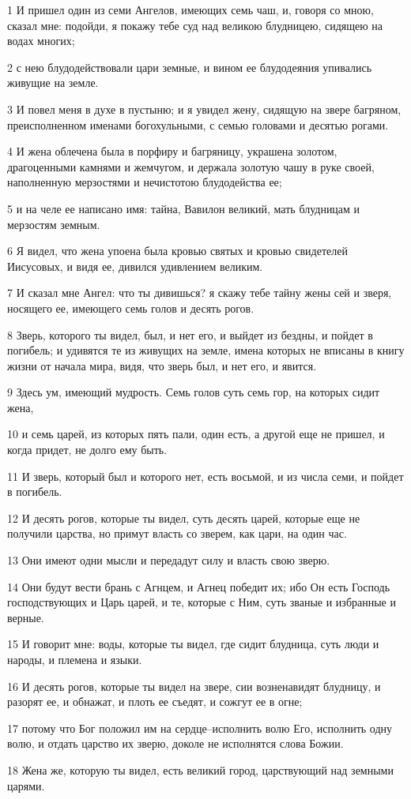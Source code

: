 \par 1 И пришел один из семи Ангелов, имеющих семь чаш, и, говоря со мною, сказал мне: подойди, я покажу тебе суд над великою блудницею, сидящею на водах многих;
\par 2 с нею блудодействовали цари земные, и вином ее блудодеяния упивались живущие на земле.
\par 3 И повел меня в духе в пустыню; и я увидел жену, сидящую на звере багряном, преисполненном именами богохульными, с семью головами и десятью рогами.
\par 4 И жена облечена была в порфиру и багряницу, украшена золотом, драгоценными камнями и жемчугом, и держала золотую чашу в руке своей, наполненную мерзостями и нечистотою блудодейства ее;
\par 5 и на челе ее написано имя: тайна, Вавилон великий, мать блудницам и мерзостям земным.
\par 6 Я видел, что жена упоена была кровью святых и кровью свидетелей Иисусовых, и видя ее, дивился удивлением великим.
\par 7 И сказал мне Ангел: что ты дивишься? я скажу тебе тайну жены сей и зверя, носящего ее, имеющего семь голов и десять рогов.
\par 8 Зверь, которого ты видел, был, и нет его, и выйдет из бездны, и пойдет в погибель; и удивятся те из живущих на земле, имена которых не вписаны в книгу жизни от начала мира, видя, что зверь был, и нет его, и явится.
\par 9 Здесь ум, имеющий мудрость. Семь голов суть семь гор, на которых сидит жена,
\par 10 и семь царей, из которых пять пали, один есть, а другой еще не пришел, и когда придет, не долго ему быть.
\par 11 И зверь, который был и которого нет, есть восьмой, и из числа семи, и пойдет в погибель.
\par 12 И десять рогов, которые ты видел, суть десять царей, которые еще не получили царства, но примут власть со зверем, как цари, на один час.
\par 13 Они имеют одни мысли и передадут силу и власть свою зверю.
\par 14 Они будут вести брань с Агнцем, и Агнец победит их; ибо Он есть Господь господствующих и Царь царей, и те, которые с Ним, суть званые и избранные и верные.
\par 15 И говорит мне: воды, которые ты видел, где сидит блудница, суть люди и народы, и племена и языки.
\par 16 И десять рогов, которые ты видел на звере, сии возненавидят блудницу, и разорят ее, и обнажат, и плоть ее съедят, и сожгут ее в огне;
\par 17 потому что Бог положил им на сердце--исполнить волю Его, исполнить одну волю, и отдать царство их зверю, доколе не исполнятся слова Божии.
\par 18 Жена же, которую ты видел, есть великий город, царствующий над земными царями.

